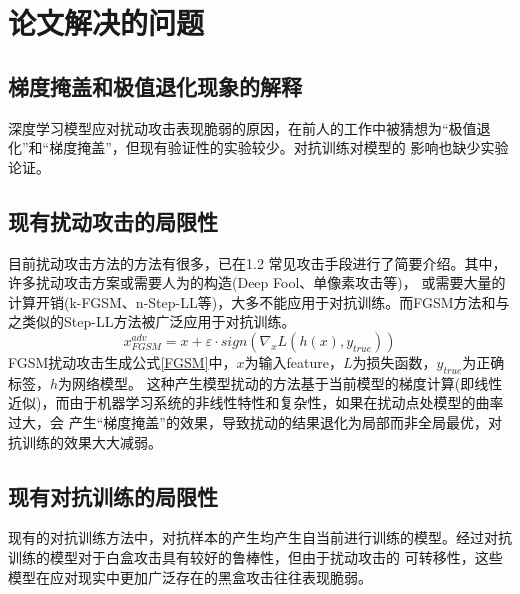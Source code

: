 \chapter{论文解决的问题}
\section{梯度掩盖和极值退化现象的解释}
深度学习模型应对扰动攻击表现脆弱的原因，在前人的工作中被猜想为“极值退化”和“梯度掩盖”，但现有验证性的实验较少。对抗训练对模型的
影响也缺少实验论证。

\section{现有扰动攻击的局限性}
目前扰动攻击方法的方法有很多，已在1.2 常见攻击手段进行了简要介绍。其中，许多扰动攻击方案或需要人为的构造(Deep Fool、单像素攻击等)，
或需要大量的计算开销(k-FGSM、n-Step-LL等)，大多不能应用于对抗训练。而FGSM方法和与之类似的Step-LL方法被广泛应用于对抗训练\cite{DBLP:conf/iclr/KurakinGB17}。
\begin{equation}
    x_{FGSM}^{adv} = x + \varepsilon \cdot sign(\nabla_x L(h(x), y_{true}))  
    \label{FGSM}
\end{equation}
FGSM扰动攻击生成公式\ref{FGSM}中，$x$为输入feature，$L$为损失函数，$y_{true}$为正确标签，$h$为网络模型。
这种产生模型扰动的方法基于当前模型的梯度计算(即线性近似)，而由于机器学习系统的非线性特性和复杂性，如果在扰动点处模型的曲率过大，会
产生“梯度掩盖”的效果，导致扰动的结果退化为局部而非全局最优，对抗训练的效果大大减弱。

\section{现有对抗训练的局限性}
现有的对抗训练方法中，对抗样本的产生均产生自当前进行训练的模型。经过对抗训练的模型对于白盒攻击具有较好的鲁棒性，但由于扰动攻击的
可转移性，这些模型在应对现实中更加广泛存在的黑盒攻击往往表现脆弱。